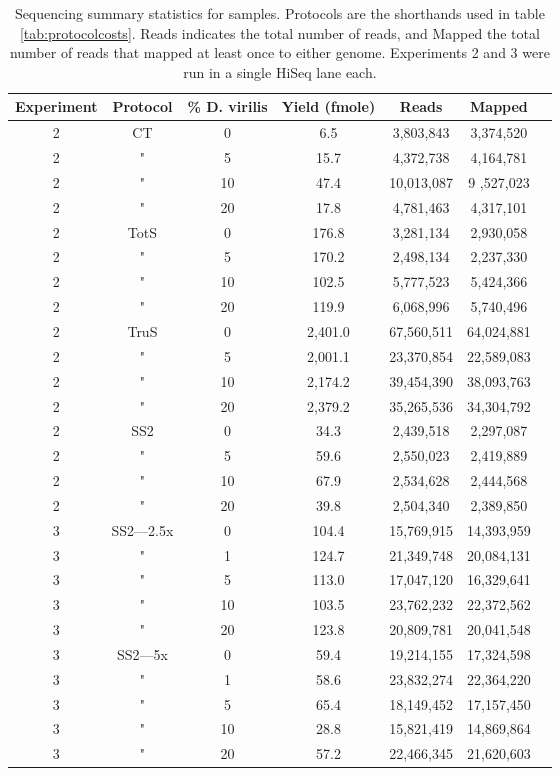 \begin{table}[htdp]
\begin{center}
\begin{tabular}{|c|c|c|c|c|c|c|} \hline
Experiment & Protocol & \%  D. virilis  &  Yield (fmole) & Reads & Mapped \\\hline 
2 & CT & 0  & 6.5  & 3,803,843 & 3,374,520 \\
2 & " &  5 & 15.7  & 4,372,738 & 4,164,781 \\
2 & " & 10 & 47.4  & 10,013,087 &9 ,527,023 \\
2 & " & 20 & 17.8  & 4,781,463 & 4,317,101 \\
2 & TotS & 0  & 176.8  & 3,281,134 & 2,930,058 \\
2 & " &  5  & 170.2  & 2,498,134 & 2,237,330 \\
2 & " & 10  & 102.5  & 5,777,523 & 5,424,366 \\
2 & " & 20  & 119.9  & 6,068,996 &5,740,496 \\
2 & TruS & 0  & 2,401.0  & 67,560,511 & 64,024,881 \\
2 & " &  5  & 2,001.1  & 23,370,854 & 22,589,083 \\
2 & " & 10  & 2,174.2  & 39,454,390 & 38,093,763 \\
2 & " & 20  & 2,379.2  & 35,265,536 & 34,304,792 \\
2 & SS2 & 0 & 34.3  & 2,439,518 & 2,297,087 \\
2 & " &  5 & 59.6  & 2,550,023 & 2,419,889 \\
2 & " & 10 & 67.9  & 2,534,628 & 2,444,568 \\
2 & " & 20 & 39.8  & 2,504,340 & 2,389,850 \\
3 & SS2---2.5x & 0 & 104.4  & 15,769,915 & 14,393,959 \\
3 & " &  1 & 124.7  & 21,349,748 & 20,084,131 \\
3 & " &  5 & 113.0  & 17,047,120 & 16,329,641 \\
3 & " & 10 & 103.5  & 23,762,232 & 22,372,562 \\
3 & " & 20 & 123.8  & 20,809,781 & 20,041,548 \\
3 & SS2---5x & 0 & 59.4  & 19,214,155 & 17,324,598 \\
3 & " &  1 & 58.6  & 23,832,274 & 22,364,220 \\
3 & " &  5 & 65.4  & 18,149,452 & 17,157,450 \\
3 & " & 10 & 28.8  & 15,821,419 & 14,869,864 \\
3 & " & 20 & 57.2  & 22,466,345 & 21,620,603 \\
\hline
\end{tabular}
\label{tab:protocols}
\caption{Sequencing summary statistics for samples.  Protocols are the shorthands used in table \ref{tab:protocolcosts}.  Reads indicates the total number of reads, and Mapped the total number of reads that mapped at least once to either genome. 
     Experiments 2 and 3 were run in a single HiSeq lane each.}
\end{center}
\end{table}
      
